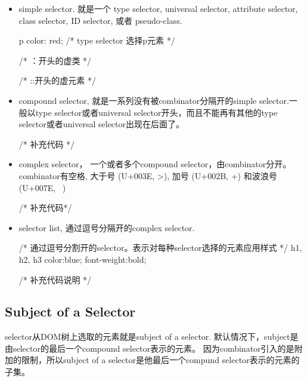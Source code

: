 \begin{itemize}

\item simple selector. 就是一个 type selector, universal selector, attribute selector, class selector, ID selector, 或者 pseudo-class.

\begin{CSS}
p { color: red; } /* type selector 选择p元素 */

/* ：开头的虚类 */

/* ::开头的虚元素 */

\end{CSS}

\item compound selector, 就是一系列没有被combinator分隔开的simple selector.一般以type selector或者universal selector开头，而且不能再有其他的type selector或者universal selector出现在后面了。

\begin{CSS}

/* 补充代码 */

\end{CSS}

\item complex selector， 一个或者多个compound selector，由combinator分开。 combinator有空格, 大于号 (U+003E, >), 加号 (U+002B, +) 和波浪号 (U+007E, ~)

\begin{CSS}

/* 补充代码*/

\end{CSS}

\item selector list, 通过逗号分隔开的complex selector.

\begin{CSS}

/* 通过逗号分割开的selector。表示对每种selector选择的元素应用样式 */
h1, h2, h3 {color:blue; font-weight:bold;}

/* 补充代码说明 */

\end{CSS}

\end{itemize}


\subsection{Subject of a Selector}

selector从DOM树上选取的元素就是subject of a selector. 默认情况下，subject是由selector的最后一个compound selector表示的元素。 因为combinator引入的是附加的限制，所以subject of a selector是他最后一个compund selector表示的元素的子集。

